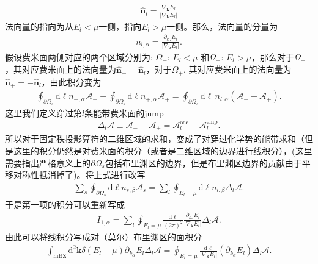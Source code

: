 \documentclass[10pt, oneside]{article}
\begin{document}
\begin{align}
	\hat{\bm{n }}_{l} = \frac{\nabla_{\bm{k }} E_{l}}{\left|\nabla_{\bm{k }} E_{l}\right|}
\end{align}
法向量的指向为从\(E_{l } < \mu\)一侧，指向\(E_{l} > \mu\)一侧。那么，法向量的分量为
\begin{align}
	n_{l, \alpha} = \frac{\partial_{k_{\alpha}} E_{l}}{\left|\nabla_{\bm{k }} E_{l}\right|}.
\end{align}
假设费米面两侧对应的两个区域分别为: \(\Omega_{-}: \, E_{l} < \mu\) 和\(\Omega_{+} : \, E_{l} > \mu\)，那么对于\(\Omega_{-}\)，其对应费米面上的法向量为\(\hat{\bm{n }}_{-} = \hat{\bm{n }}_{l}\)，对于\(\Omega_{+}\), 其对应费米面上的法向量为\(\hat{\bm{n}}_{+} = - \hat{\bm{n}}_{l}\)，由此积分变为
\begin{align}
	\oint_{\partial \Omega_{s }} \mathrm{d} \ell n_{-, \alpha} \mathcal{A}_{-} + \oint_{\partial \Omega_{s }} \mathrm{d} \ell n_{+, \alpha} \mathcal{A}_{+} = \oint_{\partial \Omega_{s }} \mathrm{d} \ell \, n_{l, \alpha} \left(\mathcal{A}_{-} - \mathcal{A}_{+}\right).
\end{align}
这里我们定义穿过第\(l\)条能带费米面的jump	
\begin{align}
	\Delta_{l } \mathcal{A} \equiv \mathcal{A}_{-} - \mathcal{A}_{+} = \mathcal{A}_{l}^{\mathrm{occ}} - \mathcal{A}_{l}^{\mathrm{emp}}.
\end{align}
所以对于固定秩投影算符的二维区域的求和，变成了对穿过化学势的能带求和（但是这里的积分仍然是对费米面的积分（或者是二维区域的边界进行线积分），(这里需要指出严格意义上的\(\partial \Omega_{s}\)包括布里渊区的边界，但是布里渊区边界的贡献由于平移对称性抵消掉了)。将上式进行改写
\begin{align}
	\sum_{s} \oint_{\partial \Omega_{s}} \mathrm{d} \ell n_{s, \beta} \mathcal{A}_{s }	= \sum_{l} \oint_{E_{l} = \mu} \mathrm{d} \ell n_{l, \beta} \Delta_{l} \mathcal{A}.
\end{align}
于是第一项的积分可以重新写成
\begin{align}
	I_{1, \alpha} = \sum_{l} \oint_{E_{l} = \mu} \frac{\mathrm{d} \ell }{\left(2 \pi\right)^{2}} \frac{\partial_{k_{\alpha}} E_{l}}{\left|\nabla_{\bm{k }} E_{l }\right|} \Delta_{l} \mathcal{A}.
\end{align}
由此可以将线积分写成对（莫尔）布里渊区的面积分
\begin{align}
	\int_{\mathrm{mBZ}} \mathrm{d}^{2} \bm{k} \delta \left( E_{l} - \mu\right) \partial_{k_{\alpha}} E_{l}  \Delta_{l} \mathcal{A} = \oint_{E_{l} = \mu} \frac{\mathrm{d} \ell}{\left|\nabla_{\bm{k }} E_{l}\right|} \left(\partial_{k_{\alpha}} E_{l} \right) \Delta_{l} \mathcal{A}.
\end{align}
\end{document}

